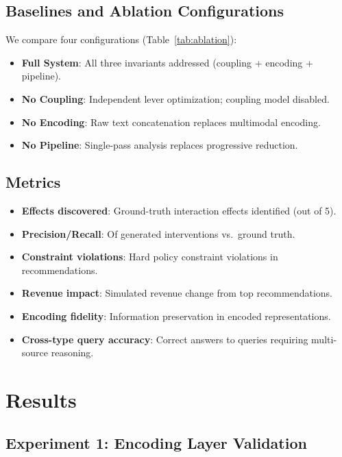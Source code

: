 \documentclass[11pt,a4paper]{article}
\begin{document}
\subsection{Baselines and Ablation Configurations}

We compare four configurations (Table~\ref{tab:ablation}):
\begin{itemize}
    \item \textbf{Full System}: All three invariants addressed (coupling + encoding + pipeline).
    \item \textbf{No Coupling}: Independent lever optimization; coupling model disabled.
    \item \textbf{No Encoding}: Raw text concatenation replaces multimodal encoding.
    \item \textbf{No Pipeline}: Single-pass analysis replaces progressive reduction.
\end{itemize}

\subsection{Metrics}

\begin{itemize}
    \item \textbf{Effects discovered}: Ground-truth interaction effects identified (out of 5).
    \item \textbf{Precision/Recall}: Of generated interventions vs.\ ground truth.
    \item \textbf{Constraint violations}: Hard policy constraint violations in recommendations.
    \item \textbf{Revenue impact}: Simulated revenue change from top recommendations.
    \item \textbf{Encoding fidelity}: Information preservation in encoded representations.
    \item \textbf{Cross-type query accuracy}: Correct answers to queries requiring multi-source reasoning.
\end{itemize}


\section{Results}
\label{sec:results}

\subsection{Experiment 1: Encoding Layer Validation}
\end{document}
